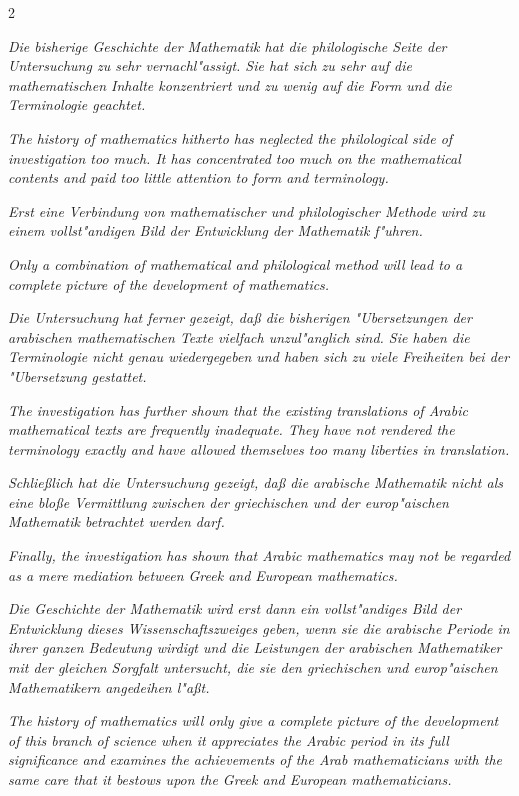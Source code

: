 \documentclass[10pt,a4paper]{article}
\begin{document}
\begin{paracol}{2}
\switchcolumn*

\textit{Die bisherige Geschichte der Mathematik hat die philologische Seite der Untersuchung zu sehr vernachl"assigt. Sie hat sich zu sehr auf die mathematischen Inhalte konzentriert und zu wenig auf die Form und die Terminologie geachtet.}

\switchcolumn

\textit{The history of mathematics hitherto has neglected the philological side of investigation too much. It has concentrated too much on the mathematical contents and paid too little attention to form and terminology.}

\switchcolumn*

\textit{Erst eine Verbindung von mathematischer und philologischer Methode wird zu einem vollst"andigen Bild der Entwicklung der Mathematik f"uhren.}

\switchcolumn

\textit{Only a combination of mathematical and philological method will lead to a complete picture of the development of mathematics.}

\switchcolumn*

\textit{Die Untersuchung hat ferner gezeigt, da\ss{} die bisherigen "Ubersetzungen der arabischen mathematischen Texte vielfach unzul"anglich sind. Sie haben die Terminologie nicht genau wiedergegeben und haben sich zu viele Freiheiten bei der "Ubersetzung gestattet.}

\switchcolumn

\textit{The investigation has further shown that the existing translations of Arabic mathematical texts are frequently inadequate. They have not rendered the terminology exactly and have allowed themselves too many liberties in translation.}

\switchcolumn*

\textit{Schlie\ss{}lich hat die Untersuchung gezeigt, da\ss{} die arabische Mathematik nicht als eine blo\ss{}e Vermittlung zwischen der griechischen und der europ"aischen Mathematik betrachtet werden darf.}

\switchcolumn

\textit{Finally, the investigation has shown that Arabic mathematics may not be regarded as a mere mediation between Greek and European mathematics.}

\switchcolumn*

\textit{Die Geschichte der Mathematik wird erst dann ein vollst"andiges Bild der Entwicklung dieses Wissenschaftszweiges geben, wenn sie die arabische Periode in ihrer ganzen Bedeutung wirdigt und die Leistungen der arabischen Mathematiker mit der gleichen Sorgfalt untersucht, die sie den griechischen und europ"aischen Mathematikern angedeihen l"a\ss{}t.}

\switchcolumn

\textit{The history of mathematics will only give a complete picture of the development of this branch of science when it appreciates the Arabic period in its full significance and examines the achievements of the Arab mathematicians with the same care that it bestows upon the Greek and European mathematicians.}

\end{paracol}
\end{document}
